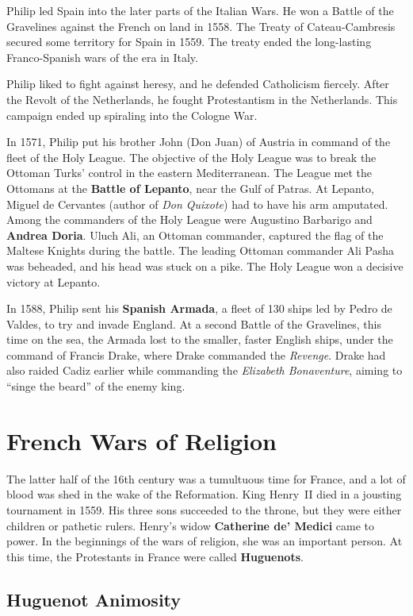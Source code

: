 Philip led Spain into the later parts of the Italian Wars.
He won a Battle of the Gravelines against the French on land in 1558.
The Treaty of Cateau-Cambresis secured some territory for Spain in 1559.
The treaty ended the long-lasting Franco-Spanish wars of the era in Italy.

Philip liked to fight against heresy, and he defended Catholicism fiercely.
After the Revolt of the Netherlands, he fought Protestantism in the Netherlands.
This campaign ended up spiraling into the Cologne War.

In 1571,
Philip put his brother John (Don Juan) of Austria in command of the fleet of the Holy League.
The objective of the Holy League
was to break the Ottoman Turks' control in the eastern Mediterranean.
The League met the Ottomans at the \textbf{Battle of Lepanto}, near the Gulf of Patras.
At Lepanto, Miguel de Cervantes (author of \textit{Don Quixote}) had to have his arm amputated.
Among the commanders of the Holy League were Augustino Barbarigo and \textbf{Andrea Doria}.
Uluch Ali, an Ottoman commander, captured the flag of the Maltese Knights during the battle.
The leading Ottoman commander Ali Pasha was beheaded, and his head was stuck on a pike.
The Holy League won a decisive victory at Lepanto.

In 1588, Philip sent his \textbf{Spanish Armada}, a fleet of 130 ships led by Pedro de Valdes,
to try and invade England.
At a second Battle of the Gravelines, this time on the sea,
the Armada lost to the smaller, faster English ships, under the command of Francis Drake,
where Drake commanded the \textit{Revenge}.
Drake had also raided Cadiz earlier while commanding the \textit{Elizabeth Bonaventure},
aiming to ``singe the beard'' of the enemy king.

\section{French Wars of Religion}

The latter half of the 16th century was a tumultuous time for France,
and a lot of blood was shed in the wake of the Reformation.
King Henry~II died in a jousting tournament in 1559.
His three sons succeeded to the throne, but they were either children or pathetic rulers.
Henry's widow \textbf{Catherine de' Medici} came to power.
In the beginnings of the wars of religion, she was an important person.
At this time, the Protestants in France were called \textbf{Huguenots}.

\subsection*{Huguenot Animosity}

